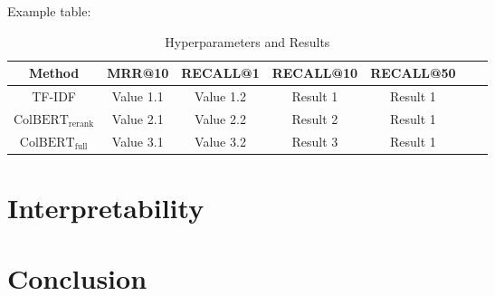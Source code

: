 \documentclass{article}
\begin{document}
Example table:
\begin{table}[htbp]
    \centering
    \label{tab:hyperparameters}
    \begin{tabular}{ccccccc}
      \toprule
      \textbf{Method} & \textbf{MRR@10}  & \textbf{RECALL@1} & \textbf{RECALL@10} & \textbf{RECALL@50} \\
      \midrule
      TF-IDF & Value 1.1 & Value 1.2 & Result 1  & Result 1 \\
      $\text{ColBERT}_\text{rerank}$ & Value 2.1 & Value 2.2 & Result 2 & Result 1 \\
      $\text{ColBERT}_\text{full}$ & Value 3.1 & Value 3.2 & Result 3 & Result 1 \\
      \bottomrule
    \end{tabular}
    \caption{Hyperparameters and Results}
\end{table}

\section{Interpretability}

\section{Conclusion}

% 
% 
\end{document}
